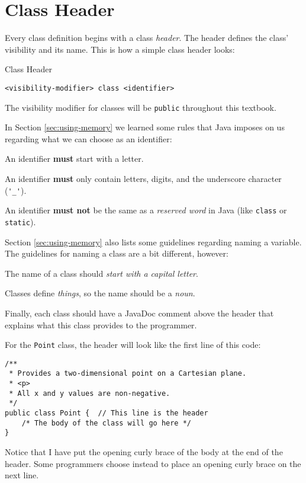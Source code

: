 \section{Class Header}

Every class definition begins with a class \textit{header}.  The header defines the class' visibility and its name.  This is how a simple class header looks:

\begin{javaformat}{Class Header}
\begin{verbatim}
<visibility-modifier> class <identifier>
\end{verbatim}
\end{javaformat}

The visibility modifier for classes will be \texttt{public} throughout this textbook.

In Section \ref{sec:using-memory} we learned some rules that Java imposes on us regarding what we can choose as an identifier:
\bi
\item An identifier \textbf{must} start with a letter.
\item An identifier \textbf{must} only contain letters, digits, and the underscore character (\lstinline{'_'}).
\item An identifier \textbf{must not} be the same as a \textit{reserved word} in Java (like \lstinline{class} or \lstinline{static}).
\ei

Section \ref{sec:using-memory} also lists some guidelines regarding naming a variable.  The guidelines for naming a class are a bit different, however:
\bi
\item The name of a class should \textit{start with a capital letter}.
\item Classes define \textit{things}, so the name should be a \textit{noun}.
\ei

Finally, each class should have a JavaDoc comment above the header that explains what this class provides to the programmer.

For the \texttt{Point} class, the header will look like the first line of this code:

\begin{verbatim}
/**
 * Provides a two-dimensional point on a Cartesian plane.
 * <p>
 * All x and y values are non-negative.
 */
public class Point {  // This line is the header
    /* The body of the class will go here */
}
\end{verbatim}

Notice that I have put the opening curly brace of the body at the end of the header.  Some programmers choose instead to place an opening curly brace on the next line.

